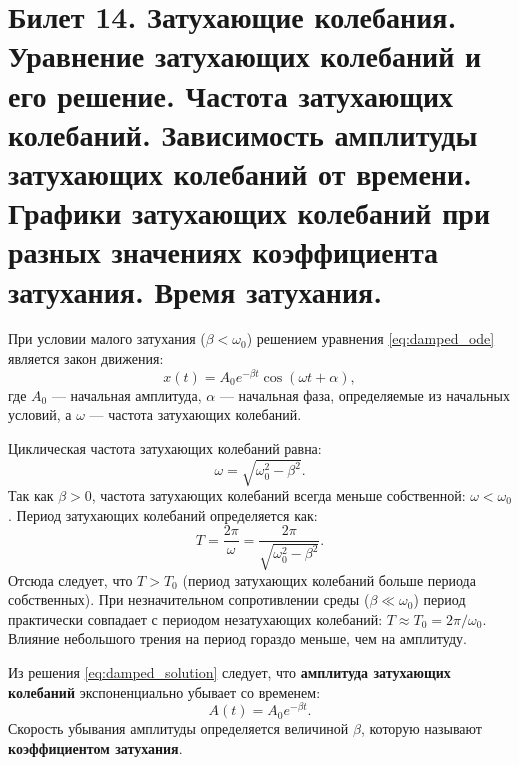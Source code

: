 \section{Билет 14. Затухающие колебания. Уравнение затухающих колебаний и его решение. Частота затухающих колебаний. Зависимость амплитуды затухающих колебаний от времени. Графики затухающих колебаний при разных значениях коэффициента затухания. Время затухания.}

\begin{definition}
При условии малого затухания ($\beta < \omega_0$) решением уравнения \eqref{eq:damped_ode} является закон движения:
\begin{equation}
    x(t) = A_0 e^{-\beta t} \cos(\omega t + \alpha), \label{eq:damped_solution}
\end{equation}
где $A_0$ --- начальная амплитуда, $\alpha$ --- начальная фаза, определяемые из начальных условий, а $\omega$ --- частота затухающих колебаний.
\end{definition}

\begin{property}
Циклическая частота затухающих колебаний равна:
\begin{equation}
    \omega = \sqrt{\omega_0^2 - \beta^2}. \label{eq:damped_freq}
\end{equation}
Так как $\beta > 0$, частота затухающих колебаний всегда меньше собственной: $\omega < \omega_0$.
Период затухающих колебаний определяется как:
\begin{equation}
    T = \frac{2\pi}{\omega} = \frac{2\pi}{\sqrt{\omega_0^2 - \beta^2}}. \label{eq:damped_period}
\end{equation}
Отсюда следует, что $T > T_0$ (период затухающих колебаний больше периода собственных). При незначительном сопротивлении среды ($\beta \ll \omega_0$) период практически совпадает с периодом незатухающих колебаний: $T \approx T_0 = 2\pi/\omega_0$. Влияние небольшого трения на период гораздо меньше, чем на амплитуду.
\end{property}

\begin{definition}
Из решения \eqref{eq:damped_solution} следует, что \textbf{амплитуда затухающих колебаний} экспоненциально убывает со временем:
\begin{equation}
    A(t) = A_0 e^{-\beta t}. \label{eq:amplitude_decay}
\end{equation}
Скорость убывания амплитуды определяется величиной $\beta$, которую называют \textbf{коэффициентом затухания}.
\end{definition}

